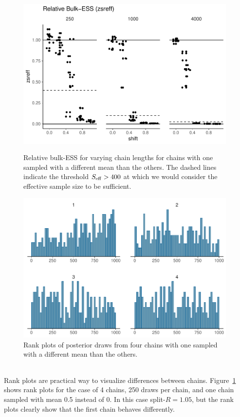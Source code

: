 \documentclass[american,]{article}
\theoremstyle{definition}
\begin{document}
\begin{figure}[tp]
  \centering
  \begin{minipage}{0.48\textwidth}
  \includegraphics[width=0.98\textwidth]{graphics/zsreff-shifted-chain-1.pdf}
  \caption{Relative bulk-ESS for varying chain lengths for chains with one
    sampled with a different mean than the others. The dashed lines
    indicate the threshold \(S_{\rm eff} > 400\) at which we would
    consider the effective sample size to be sufficient.}
  \label{fig:zsreff-shifted-chain-1}
\end{minipage}
\hfill
  \begin{minipage}{0.48\textwidth}
  \includegraphics[width=0.98\textwidth]{graphics/hist-shifted-chain-1.pdf}
  \caption{Rank plots of posterior draws from four chains with one
    sampled with a different mean than the others.\\~\\}
  \label{fig:hist-shifted-chain-1}
\end{minipage}
\end{figure}
Rank plots are practical way to visualize differences between
chains. Figure~\ref{fig:hist-shifted-chain-1} shows rank plots for the
case of 4 chains, 250 draws per chain, and one chain sampled with mean
0.5 instead of 0. In this case split-\(\widehat{R} = 1.05\), but the
rank plots clearly show that the first chain behaves differently.
\end{document}
